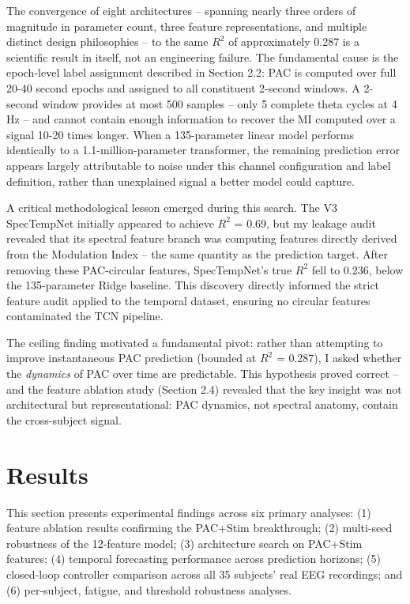 \documentclass[11pt,letterpaper]{article}
\begin{document}
The convergence of eight architectures -- spanning nearly three orders of magnitude in parameter count, three feature representations, and multiple distinct design philosophies -- to the same $R^2$ of approximately 0.287 is a scientific result in itself, not an engineering failure. The fundamental cause is the epoch-level label assignment described in Section 2.2: PAC is computed over full 20-40 second epochs and assigned to all constituent 2-second windows. A 2-second window provides at most 500 samples -- only 5 complete theta cycles at 4 Hz -- and cannot contain enough information to recover the MI computed over a signal 10-20 times longer. When a 135-parameter linear model performs identically to a 1.1-million-parameter transformer, the remaining prediction error appears largely attributable to noise under this channel configuration and label definition, rather than unexplained signal a better model could capture.

A critical methodological lesson emerged during this search. The V3 SpecTempNet initially appeared to achieve $R^2$ = 0.69, but my leakage audit revealed that its spectral feature branch was computing features directly derived from the Modulation Index -- the same quantity as the prediction target. After removing these PAC-circular features, SpecTempNet's true $R^2$ fell to 0.236, below the 135-parameter Ridge baseline. This discovery directly informed the strict feature audit applied to the temporal dataset, ensuring no circular features contaminated the TCN pipeline.

The ceiling finding motivated a fundamental pivot: rather than attempting to improve instantaneous PAC prediction (bounded at $R^2$ = 0.287), I asked whether the \textit{dynamics} of PAC over time are predictable. This hypothesis proved correct -- and the feature ablation study (Section 2.4) revealed that the key insight was not architectural but representational: PAC dynamics, not spectral anatomy, contain the cross-subject signal.

\section{Results}

This section presents experimental findings across six primary analyses: (1) feature ablation results confirming the PAC+Stim breakthrough; (2) multi-seed robustness of the 12-feature model; (3) architecture search on PAC+Stim features; (4) temporal forecasting performance across prediction horizons; (5) closed-loop controller comparison across all 35 subjects' real EEG recordings; and (6) per-subject, fatigue, and threshold robustness analyses.
\end{document}
